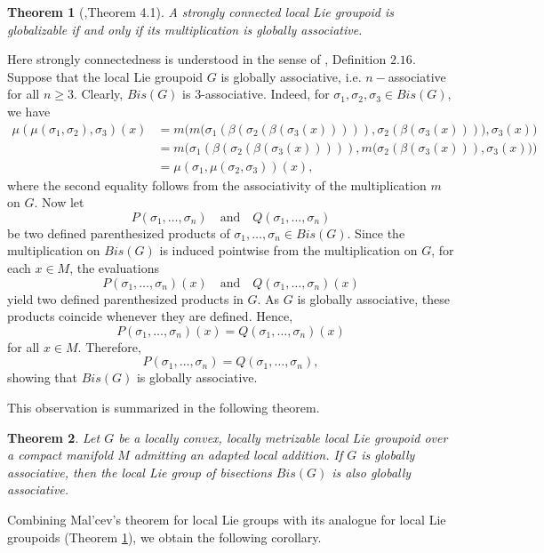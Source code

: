 \documentclass[12pt,a4paper]{amsart}
\theoremstyle{plain}
\newtheorem{theorem}{Theorem}[section]
\theoremstyle{definition}
\begin{document}
\begin{theorem}[{\cite{Fernandes},Theorem 4.1}]\label{Th2}
 A strongly connected local Lie groupoid is globalizable if and only if its multiplication is globally associative.
\end{theorem}
Here strongly connectedness is understood in the sense of \cite{Fernandes}, Definition $2.16$.
Suppose that the local Lie groupoid $G$ is globally associative, i.e. $n-$associative for all $n\geq3$.
Clearly, \( Bis(G) \) is $3$-associative. Indeed, for
\(\sigma_1,\sigma_2,\sigma_3 \in Bis(G)\), we have
\begin{align*}
\mu(\mu(\sigma_1,\sigma_2),\sigma_3)(x)
&=
m\Big(
m\big(
\sigma_1(\beta(\sigma_2(\beta(\sigma_3(x))))),
\sigma_2(\beta(\sigma_3(x)))
\big),
\sigma_3(x)
\Big) \\
&=
m\Big(
\sigma_1(\beta(\sigma_2(\beta(\sigma_3(x))))),
m\big(
\sigma_2(\beta(\sigma_3(x))),
\sigma_3(x)
\big)
\Big) \\
&=
\mu(\sigma_1,\mu(\sigma_2,\sigma_3))(x),
\end{align*}
where the second equality follows from the associativity of the multiplication \(m\) on \(G\).
Now let
\[
P(\sigma_1,\dots,\sigma_n)
\quad \text{and} \quad
Q(\sigma_1,\dots,\sigma_n)
\]
be two defined parenthesized products of
$\sigma_1,\dots,\sigma_n \in Bis(G)$.
Since the multiplication on $Bis(G)$ is induced pointwise from the multiplication on $G$, for each $x \in M$, the evaluations
\[
P(\sigma_1,\dots,\sigma_n)(x)
\quad \text{and} \quad
Q(\sigma_1,\dots,\sigma_n)(x)
\]
yield two defined parenthesized products in $G$. As $G$ is globally associative, these products coincide whenever they are defined. Hence,
\[
P(\sigma_1,\dots,\sigma_n)(x)
=
Q(\sigma_1,\dots,\sigma_n)(x)
\]
for all $x \in M$. Therefore,
\[
P(\sigma_1,\dots,\sigma_n)
=
Q(\sigma_1,\dots,\sigma_n),
\]
showing that $Bis(G)$ is globally associative.

This observation is summarized in the following theorem.

\begin{theorem}\label{th3}
Let $G$ be a locally convex, locally metrizable local Lie groupoid over a compact manifold $M$ admitting an adapted local addition. If $G$ is globally associative, then the local Lie group of bisections $Bis(G)$ is also globally associative.
\end{theorem}
Combining Mal'cev's theorem for local Lie groups with its analogue for local Lie groupoids (Theorem \ref{Th2}), we obtain the following corollary.
  
\end{document}
